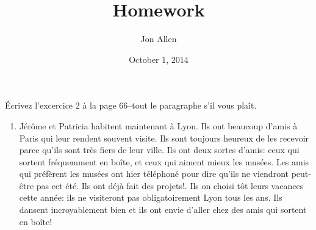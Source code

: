 \documentclass[letterpaper]{article}
\begin{document}
\title{Homework}
\date{October 1, 2014}
\author{Jon Allen}
\maketitle
Écrivez l'excercice 2 à la page 66--tout le paragraphe s'il vous plaît.
\begin{enumerate}
\item
Jérôme et Patricia habitent maintenant à Lyon. Ils ont beaucoup d'amis à Paris qui leur rendent souvent visite. Ils sont toujours heureux de les recevoir parce qu'ils sont très fiers de leur ville. Ils ont deux sortes d'amis: ceux qui sortent fréquemment en boîte, et ceux qui aiment mieux les musées. Les amis qui préfèrent les musées ont hier téléphoné pour dire qu'ils ne viendront peut-être pas cet été. Ils ont déjà fait des projets!. Ils on choisi tôt leurs vacances cette année: ils ne visiteront pas obligatoirement Lyon tous les ans. Ils dansent incroyablement bien et ils ont envie d'aller chez des amis qui sortent en boîte!
\end{enumerate}
\end{document}
